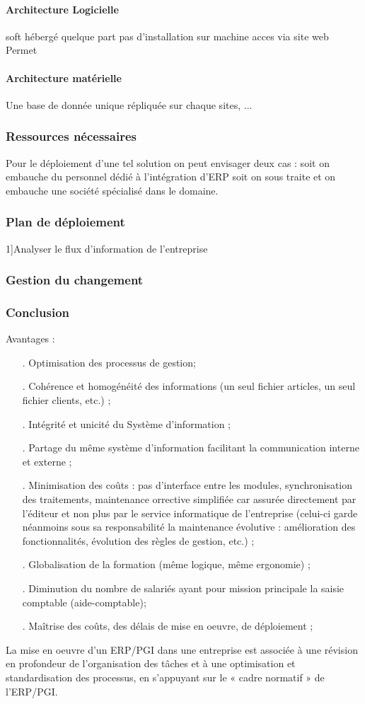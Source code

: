 \paragraph{Architecture Logicielle}
soft hébergé quelque part
pas d'installation sur machine
acces via site web
Permet 
\paragraph{Architecture matérielle}
Une base de donnée unique répliquée sur chaque sites, ...
\subsubsection{Ressources nécessaires}
Pour le déploiement d'une tel solution on peut envisager deux cas : soit on embauche du personnel dédié à l'intégration d'ERP soit on sous traite et on embauche une société spécialisé dans le domaine.
\subsubsection{Plan de déploiement}
1]Analyser le flux d'information de l'entreprise
\subsubsection{Gestion du changement}

\subsubsection{Conclusion}
Avantages :
\begin{itemize}
\item[.]Optimisation des processus de gestion;
\item[.]Cohérence et homogénéité des informations (un seul fichier articles, un seul fichier clients, etc.) ;
\item[.]Intégrité et unicité du Système d'information ;
\item[.]Partage du même système d’information facilitant la communication interne et externe ;
\item[.]Minimisation des coûts : pas d’interface entre les modules, synchronisation des traitements, maintenance orrective simplifiée car assurée directement par l'éditeur et non plus par le service informatique de l'entreprise (celui-ci garde néanmoins sous sa responsabilité la maintenance évolutive : amélioration des fonctionnalités, évolution des règles de gestion, etc.) ;
\item[.]Globalisation de la formation (même logique, même ergonomie) ;
\item[.]Diminution du nombre de salariés ayant pour mission principale la saisie comptable (aide-comptable);
\item[.]Maîtrise des coûts, des délais de mise en oeuvre, de déploiement ;\\
\end{itemize}
La mise en oeuvre d'un ERP/PGI dans une entreprise est associée à une révision en profondeur de l'organisation des tâches et à une optimisation et standardisation des processus, en s'appuyant sur le « cadre normatif » de l'ERP/PGI.\\

